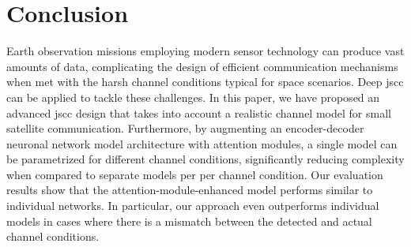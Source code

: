 \documentclass[conference]{IEEEtran}
\begin{document}
\section{Conclusion}
\label{sec:conclusion}

Earth observation missions employing modern sensor technology can produce vast amounts of data, complicating the design of efficient communication mechanisms when met with the harsh channel conditions typical for space scenarios.
Deep \Acf{jscc} can be applied to tackle these challenges.
In this paper, we have proposed an advanced \ac{jscc} design that takes into account a realistic channel model for small satellite communication.
Furthermore, by augmenting an encoder-decoder neuronal network model architecture with attention modules, a single model can be parametrized for different channel conditions, significantly reducing complexity when compared to separate models per per channel condition.
Our evaluation results show that the attention-module-enhanced model performs similar to individual networks.
In particular, our approach even outperforms individual models in cases where there is a mismatch between the detected and actual channel conditions.



\end{document}

